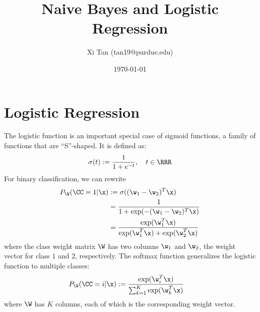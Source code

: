 \documentclass{article}
\title{Naive Bayes and Logistic Regression}
\author{Xi Tan (tan19@purdue.edu)}
\date{\today}
\begin{document}
\maketitle

\tableofcontents

\section{Logistic Regression}
The logistic function is an important special case of sigmoid functions, a family of functions that are ``S''-shaped. It is defined as:
\begin{align}
	\sigma(t) := \frac{1}{1+e^{-t}},\quad t \in \RRR
\end{align}
For binary classification, we can rewrite
\begin{align}
	P_{\W}(\CC = 1 | \x) &:= \sigma((\w_1-\w_2)^T\x)\\
	&= \frac{1}{1+\exp(-(\w_1-\w_2)^T\x)}\\
	&= \frac{\exp(\w_1^T\x)}{\exp(\w_1^T\x)+\exp(\w_2^T\x)}
\end{align}
where the class weight matrix $\W$ has two columns $\w_1$ and $\w_2$, the weight vector for class $1$ and $2$, respectively. The softmax function generalizes the logistic function to multiple classes:
\begin{align}
	P_{\W}(\CC = i | \x) &:= \frac{\exp(\w_i^T\x)}{\sum_{k=1}^K\exp(\w_k^T\x)}
\end{align}
where $\W$ has $K$ columns, each of which is the corresponding weight vector.
\end{document}

